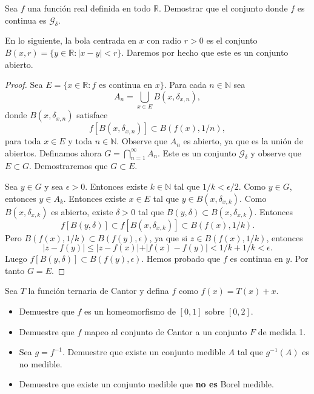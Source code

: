 \documentclass[12pt]{article}
\newcommand{\N}{\mathbb{N}}
\newcommand{\R}{\mathbb{R}}
\newenvironment{problem}[2][Problema]{\begin{trivlist}
\item[\hskip \labelsep {\bfseries #1}\hskip \labelsep {\bfseries #2.}]}{\end{trivlist}}
\begin{document}
\begin{problem}{9} Sea $f$ una función real definida en todo $\R$. Demostrar que el conjunto donde $f$ es continua es $\mathcal{G}_\delta$. 
\end{problem}

En lo siguiente, la bola centrada en $x$ con radio $r > 0$ es el conjunto $B(x, r) = \{y \in \R: \lvert x - y \lvert < r \}$. Daremos por hecho que este es un conjunto abierto.
\begin{proof}
Sea $E = \{x \in \R : f \text{ es continua en } x \}$. Para cada $n \in \N$ sea 
$$A_n = \bigcup_{x\in E} B(x, \delta_{x, n}), $$
donde $B(x, \delta_{x, n})$ satisface  
$$ f[B(x, \delta_{x, n})] \subset B(f(x), 1/n), $$
para toda $x \in E$ y toda $n \in \N.$ Observe que $A_n$ es abierto, ya que es la unión de abiertos. Definamos ahora $G = \bigcap_{n=1}^{\infty} A_n$. Este es un conjunto $\mathcal{G}_\delta$ y observe que $E \subset G$. Demostraremos que $G \subset E$.

Sea $y \in G$ y sea $\epsilon > 0.$ Entonces existe $k \in \N$ tal que $1/k < \epsilon/ 2 $. Como $y \in G$, entonces $y \in A_k$. Entonces existe $x \in E$ tal que $y \in B(x, \delta_{x, k})$. Como $B(x, \delta_{x, k})$ es abierto, existe $\delta > 0 $ tal que $B(y, \delta) \subset B(x, \delta_{x, k})$. Entonces 
$$f[B(y, \delta)] \subset f[B(x, \delta_{x, k})] \subset B(f(x), 1/k). $$
Pero $ B(f(x), 1/k) \subset B(f(y), \epsilon)$, ya que si $z \in B(f(x), 1/k)$, entonces $$\lvert z - f(y) \lvert \leq \lvert z - f(x) \lvert + \lvert f(x) - f(y) \lvert < 1/k + 1/k < \epsilon.$$
Luego $f[B(y, \delta)] \subset B(f(y), \epsilon)$. Hemos probado que $f$ es continua en $y$. Por tanto $G = E$.
\end{proof}

\begin{problem}{10} Sea $T$ la función ternaria de Cantor y defina $f$ como $f(x) = T(x) + x.$
\begin{itemize}
    \item[a)] Demuestre que $f$ es un homeomorfismo de $[0, 1]$ sobre $[0, 2].$ 
    \item[b)] Demuestre que $f$ mapeo al conjunto de Cantor a un conjunto $F$ de medida 1.
    \item[c)] Sea $g = f^{-1}$. Demuestre que existe un conjunto medible $A$ tal que $g^{-1}(A)$ es no medible.
    \item[d)] Demuestre que existe un conjunto medible que \textbf{no es} Borel medible. 
\end{itemize}
\end{problem}
\end{document}
